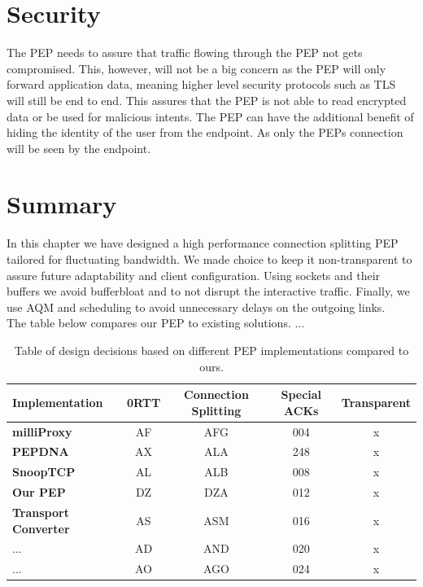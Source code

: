 \documentclass[a4paper,english, 11pt]{report}
\begin{document}
\section{Security}
The PEP needs to assure that traffic flowing through the PEP not gets compromised. This, however, will not be a big concern as the PEP will only forward application data, meaning higher level security protocols such as TLS will still be end to end. This assures that the PEP is not able to read encrypted data or be used for malicious intents. The PEP can have the additional benefit of hiding the identity of the user from the endpoint. As only the PEPs connection will be seen by the endpoint.

\section{Summary}
In this chapter we have designed a high performance connection splitting PEP tailored for fluctuating bandwidth. We made choice to keep it non-transparent to assure future adaptability and client configuration. Using sockets and their buffers we avoid bufferbloat and to not disrupt the interactive traffic. Finally, we use AQM and scheduling to avoid unnecessary delays on the outgoing links.\\

The table below compares our PEP to existing solutions. ...\\

\begin{table}[h!]
\centering
\begin{tabularx}{\linewidth}{lCCCC}
\toprule
Implementation & 0RTT & Connection Splitting & Special ACKs & Transparent \\
\midrule
\textbf{milliProxy} & AF & AFG & 004 & x \\
\textbf{PEPDNA} & AX & ALA & 248 & x \\
\textbf{SnoopTCP} & AL & ALB & 008 & x \\
\textbf{Our PEP} & DZ & DZA & 012 & x \\
\textbf{Transport Converter} & AS & ASM & 016 & x \\
... & AD & AND & 020 & x \\
... & AO & AGO & 024 & x \\
\bottomrule
\end{tabularx}
\caption{Table of design decisions based on different PEP implementations compared to ours.}
\end{table}
\end{document}
